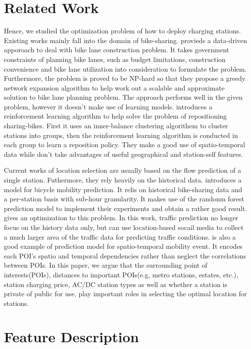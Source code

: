 \documentclass[conference]{IEEEtran}
\begin{document}
\section{Related Work}
Hence, we studied the optimization problem of how to deploy charging stations. Existing works mainly fall into the domain of bike-sharing. \cite{b1} provieds a data-driven apporoach to deal with bike lane construction problem. It takes government constraints of planning bike lanes, such as budget limitations, construction convenience and bike lane utilization into consideration to formulate the problem. Furthermore, the problem is proved to be NP-hard so that they propose a greedy network expansion algorithm to help work out a scalable and approximate solution to bike lane planning problem. The approach performs well in the given problem, however it doesn't make use of learning models. \cite{b4} introduces a reinforcement learning algorithm to help solve the problem of repositioning sharing-bikes. First it uses an inner-balance clustering algorithem to cluster stations into groups, then the reinforcement learning algorithm is conducted in each group to learn a reposition policy. They make a good use of spatio-temporal data while don't take advantages of useful geographical and station-self features. 

Current works of location selection are usually based on the flow prediction of a single station. Futhermore, they rely heavily on the historical data. \cite{b9} introduces a model for bicycle mobility prediction. It relis on historical bike-sharing data and a per-station basis with sub-hour granularity. It makes use of the randonm forest prediction model to implement their experiments and obtain a rather good result. \cite{b6} gives an optimization to this problem. In this work, traffic prediction no longer focus on the history data only, but can use location-based socail media to collect a much larger area of the traffic data for predicting traffic conditions. \cite{b8} is also a good example of prediction model for spatio-temporal mobility event. It encodes each POI's spatio and temporal dependencies rather than neglect the correlations between POIs. In this paper, we argue that the surrounding point of interests(POIs), distances to important POIs(e.g, metro stations, estates, etc.), station charging price, AC/DC station types as well as whether a station is private of public for use, play important roles in selecting the optimal location for stations.

\section{Feature Description}
\end{document}
